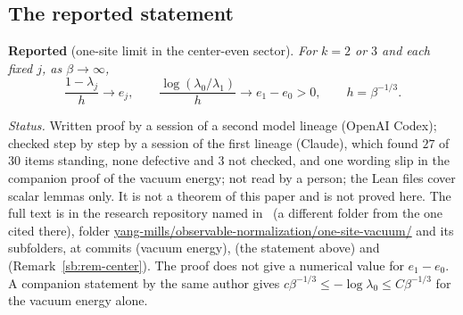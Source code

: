\subsection{The reported statement}

\medskip\noindent\textbf{Reported} (one-site limit in the center-even sector). \emph{For $k=2$ or $3$ and
each fixed $j$, as $\beta\to\infty$,}
\[
\frac{1-\lambda_j}{h}\longrightarrow e_j,\qquad
\frac{\log(\lambda_0/\lambda_1)}{h}\longrightarrow e_1-e_0>0,\qquad h=\beta^{-1/3}.
\]

\noindent\emph{Status.} Written proof by a session of a second model lineage (OpenAI Codex);
checked step by step by a session of the first lineage (Claude), which found $27$ of $30$ items
standing, none defective and $3$ not checked, and one wording slip in the companion proof of the vacuum
energy; not read by a person; the Lean files cover scalar lemmas only. It is not a theorem of this paper and is
not proved here. The full text is in the research repository named in~\cite{Repo} (a different folder from
the one cited there), folder \url{yang-mills/observable-normalization/one-site-vacuum/} and its
subfolders, at commits  (vacuum energy),  (the statement above) and
 (Remark~\ref{sb:rem-center}).
The proof does not give a numerical value for $e_1-e_0$. A companion statement by the same author
gives $c\beta^{-1/3}\le-\log\lambda_0\le C\beta^{-1/3}$ for the vacuum energy alone.

